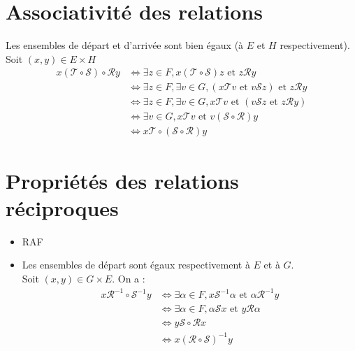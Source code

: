 \documentclass[../main.tex]{subfiles}
\begin{document}
\setcounter{section}{17}
\section{Associativité des relations}
Les ensembles de départ et d'arrivée sont bien égaux (à $E$ et $H$ respectivement).
Soit $(x, y) \in E \times H$
\begin{align*}
    x(\mathcal{T} \circ \mathcal{S}) \circ \mathcal{R}y &\Leftrightarrow \exists z \in F, x(\mathcal{T} \circ \mathcal{S})z \text{ et } z\mathcal{R}y \\
    &\Leftrightarrow \exists z \in F, \exists v \in G, (x\mathcal{T}v \text{ et } v\mathcal{S}z) \text{ et } z\mathcal{R}y \\
    &\Leftrightarrow \exists z \in F, \exists v \in G, x\mathcal{T}v \text{ et } (v\mathcal{S}z \text{ et } z\mathcal{R}y) \\
    &\Leftrightarrow \exists v \in G, x \mathcal{T} v \text{ et } v(\mathcal{S} \circ \mathcal{R})y \\
    &\Leftrightarrow x\mathcal{T} \circ (\mathcal{S} \circ \mathcal{R})y
\end{align*}

\setcounter{section}{19}
\section{Propriétés des relations réciproques}
\begin{itemize}
    \item RAF
    \item Les ensembles de départ sont égaux respectivement à $E$ et à $G$. \\
    Soit $(x, y) \in G \times E$. On a :
    \begin{align*}
        x \mathcal{R}^{-1} \circ \mathcal{S}^{-1} y &\Leftrightarrow \exists \alpha \in F, x \mathcal{S}^{-1} \alpha \text{ et } \alpha \mathcal{R}^{-1} y \\
        &\Leftrightarrow \exists \alpha \in F, \alpha \mathcal{S} x \text{ et } y \mathcal{R} \alpha \\
        &\Leftrightarrow y \mathcal{S} \circ \mathcal{R} x \\
        &\Leftrightarrow x (\mathcal{R} \circ \mathcal{S})^{-1} y
    \end{align*}
\end{itemize}

\setcounter{section}{22}
\end{document}
